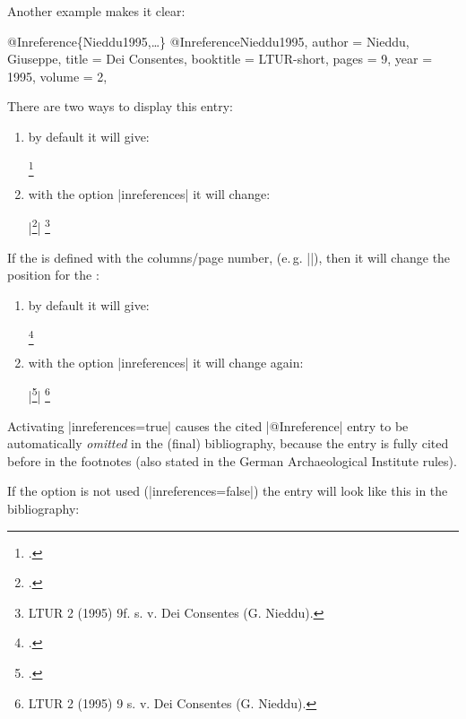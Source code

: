 \documentclass[a4paper,
10pt,
greek,
french,
spanish,
italian,
ngerman,
english
]{ltxdoc}
\begin{document}
Another example makes it clear: 
\begin{bibexample}[label=Nieddu1995]{{@}Inreference\{Nieddu1995,…\}}
@Inreference{Nieddu1995,
  author    = {Nieddu, Giuseppe},
  title     = {Dei Consentes},
  booktitle = LTUR-short,
  pages     = {9\psq},
  year      = {1995},
  volume    = {2},
}
\end{bibexample}

There are two ways to display this entry:
 \begin{enumerate}
 \item by default it will give:  
 \begin{example}
\footnote{\cite{Nieddu1995}.}
 \end{example}
 \item with the option |inreferences| it will change:
 \begin{tcolorbox}[examplebox]
 |\footnote{\cite{Nieddu1995}.}|
 \tcblower
\footnote{LTUR 2 (1995) 9f. s. v. Dei Consentes (G. Nieddu).}
 \end{tcolorbox}
  \end{enumerate}

If the  is defined with the columns/page number, (e.\,g. |\cite[9]{Nieddu1995}|), 
then it will change the position for the :
\begin{enumerate} 
 \item by default it will give: 
 \begin{example}
\footnote{\cite[9]{Nieddu1995}.}
 \end{example}
 \item with the option |inreferences| it will change again:
  \begin{tcolorbox}[examplebox]
|\footnote{\cite[9]{Nieddu1995}.}|
 \tcblower
\footnote{LTUR 2 (1995) 9 s. v. Dei Consentes (G. Nieddu).}
 \end{tcolorbox}
  \end{enumerate}



\begin{marker}
    Activating |inreferences=true| causes the cited |@Inreference| entry to be automatically \emph{omitted} in the (final) bibliography,
because the entry is fully cited before in the footnotes (also stated in the German Archaeological Institute rules).
\end{marker}

If the option is not used (|inreferences=false|) the entry will look like this in the bibliography:
\end{document}
